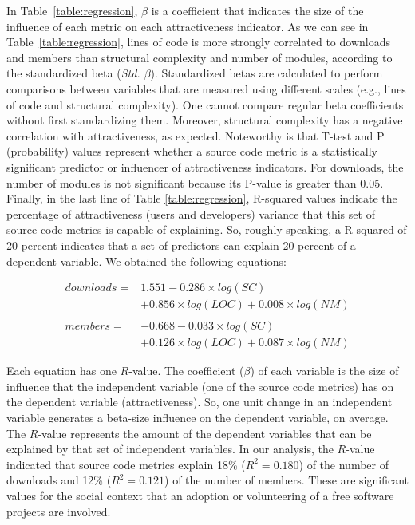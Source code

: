 \documentclass[conference]{IEEEtran}
\begin{document}
In Table~\ref{table:regression}, $\beta$ is a coefficient that indicates the
size of the influence of each metric on each attractiveness indicator.
%
As we can see in Table~\ref{table:regression}, lines of code is more strongly
correlated to downloads and members than structural complexity and number of modules,
according to the standardized beta (\emph{Std. $\beta$}). Standardized betas are calculated to perform comparisons between variables that are measured using different scales (e.g., lines of code and structural complexity). One cannot compare regular beta coefficients without first standardizing them.
%
Moreover, structural complexity has a negative correlation with attractiveness,
as expected. Noteworthy is that T-test and P (probability) values represent whether a source code
metric is a statistically significant predictor or influencer of attractiveness indicators.
%
For downloads, the number of modules is not significant because
its P-value is greater than 0.05. Finally, in the last line of
Table \ref{table:regression}, R-squared values indicate the percentage of attractiveness (users and developers) variance that
this set of source code metrics is capable of explaining. So, roughly speaking, a R-squared of 20 percent indicates that a set of predictors can explain 20 percent of a dependent variable.
%
We obtained the following equations:

\begin{displaymath}
\begin{array}{lll}
downloads = & 1.551 - 0.286\times log(SC) \\
            & + 0.856\times log(LOC) + 0.008\times log(NM) \\
\\
members = & -0.668 - 0.033\times log(SC) \\
            & + 0.126\times log(LOC) + 0.087\times log(NM)
\end{array}
\end{displaymath}

Each equation has one $R$-value. The coefficient ($\beta$) of each variable is
the size of influence that the independent variable (one of the source code metrics)
has on the dependent variable (attractiveness). So, one unit change in an independent variable generates a beta-size influence on the dependent variable, on average.
%
The $R$-value represents the amount of the dependent variables that can be
explained by that set of independent variables.
%
In our analysis, the $R$-value indicated that source code metrics explain 18\% ($R^2 = 0.180$) of the number of downloads and 12\% ($R^2 = 0.121$) of the number of members. These are significant values for the social context that an adoption or volunteering of a free software projects are involved.
\end{document}
